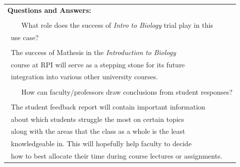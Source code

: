 \documentclass[12pt,a4paper]{article}
\newcommand{\tabitem}{\\~~\llap{\textbullet}~~}
\begin{document}
\begin{appendices}
\begin{table}[H]
\begin{tabular}{|p{13cm}|}
            \textbf{Questions and Answers:} \\\makecell[l]{
                \tabitem What role does the success of \textit{Intro to Biology} trial play in this
                    \\\quad~use case?\\
                    \\\quad~The success of Mathesis in the \textit{Introduction to Biology}
                    \\\quad~course at RPI will serve as a stepping stone for its future
                    \\\quad~integration into various other university courses.\\
                \tabitem How can faculty/professors draw conclusions from student responses?\\
                    \\\quad~The student feedback report will contain important information
                    \\\quad~about which students struggle the most on certain topics
                    \\\quad~along with the areas that the class as a whole is the least
                    \\\quad~knowledgeable in.  This will hopefully help faculty to decide
                    \\\quad~how to best allocate their time during course lectures or assignments.
            }\\\hline
        \end{tabular}
        \end{table}

    \end{appendices}
\end{document}
